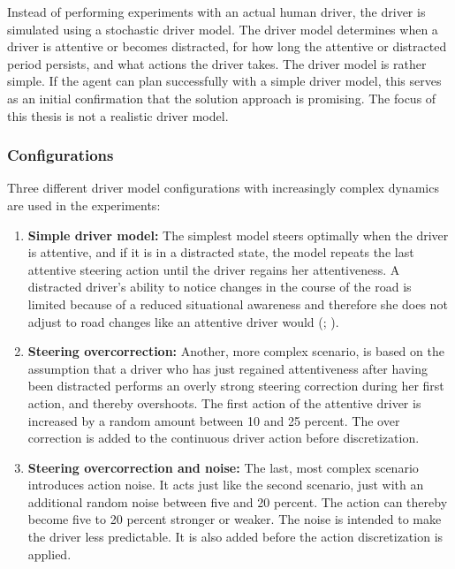 Instead of performing experiments with an actual human driver, the driver is simulated using a stochastic driver model. The driver model determines when a driver is attentive or becomes distracted, for how long the attentive or distracted period persists, and what actions the driver takes. The driver model is rather simple. If the agent can plan successfully with a simple driver model, this serves as an initial confirmation that the solution approach is promising. The focus of this thesis is not a realistic driver model.


\subsubsection{Configurations}

Three different driver model configurations with increasingly complex dynamics are used in the experiments:
\begin{enumerate}
    \item \textbf{Simple driver model:} The simplest model steers optimally when the driver is attentive, and if it is in a distracted state, the model repeats the last attentive steering action until the driver regains her attentiveness. A distracted driver's ability to notice changes in the course of the road is limited because of a reduced situational awareness and therefore she does not adjust to road changes like an attentive driver would (\cite{driver-awareness}; \cite{driver-awareness2}).
    \item \textbf{Steering overcorrection:} Another, more complex scenario, is based on the assumption that a driver who has just regained attentiveness after having been distracted performs an overly strong steering correction during her first action, and thereby overshoots. The first action of the attentive driver is increased by a random amount between 10 and 25 percent. The over correction is added to the continuous driver action before discretization.
    \item \textbf{Steering overcorrection and noise:} The last, most complex scenario introduces action noise. It acts just like the second scenario, just with an additional random noise between five and 20 percent. The action can thereby become five to 20 percent stronger or weaker. The noise is intended to make the driver less predictable. It is also added before the action discretization is applied.
\end{enumerate}

